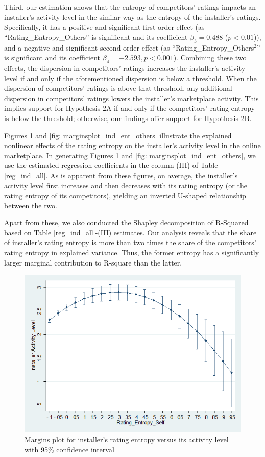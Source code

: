 \documentclass[mnsc,blindrev]{informs3}
\begin{document}
	Third,  our estimation shows that the entropy of competitors' ratings impacts an installer's activity level in the similar way as the entropy of the installer's ratings. Specifically, it has a positive and significant first-order effect (as ``Rating\_Entropy\_Others'' is significant and its coefficient $\beta_{3} =  0.488$ ($p<0.01$)), and a negative and significant second-order effect (as ``Rating\_Entropy\_Others$^{2}$'' is significant and its coefficient $\beta_{4} = -2.593, p<0.001$). Combining these two effects,
	the dispersion in competitors' ratings increases the installer's activity level if and only if the aforementioned dispersion is below a threshold. When the dispersion of competitors' ratings is above that threshold, any additional dispersion in competitors' ratings lowers the installer's marketplace activity. This implies support for Hypothesis 2A if and only if the competitors' rating entropy is below the threshold; otherwise, our findings offer support for Hypothesis 2B.
	
	
	Figures \ref{fig: marginsplot_ind_ent_self} and  \ref{fig: marginsplot_ind_ent_others} illustrate the explained nonlinear effects of the rating entropy on the installer's activity level in the online marketplace. In generating Figures \ref{fig: marginsplot_ind_ent_self} and  \ref{fig: marginsplot_ind_ent_others}, we use the estimated regression coefficients in the column (III) of Table \ref{reg_ind_all}. As is apparent from these figures, on average, the installer's activity level first increases and then decreases with its rating entropy (or the rating entropy of its competitors), yielding an inverted U-shaped relationship between the two.

{\color{black} Apart from these, we also conducted the Shapley decomposition of R-Squared based on Table \ref{reg_ind_all}-(III) estimates. Our analysis reveals that the share of installer's rating entropy is more than two times the share of the competitors' rating entropy in explained variance. Thus, the former entropy has a significantly larger marginal contribution to R-square than the latter.}
	
	\begin{figure}
		\centering
		\includegraphics[width=0.7\linewidth]{marginsplot_entself.png}
		\caption{Margins plot for installer's rating entropy versus its activity level with 95\% confidence interval}
		\label{fig: marginsplot_ind_ent_self}
	\end{figure}
	
\end{document}
